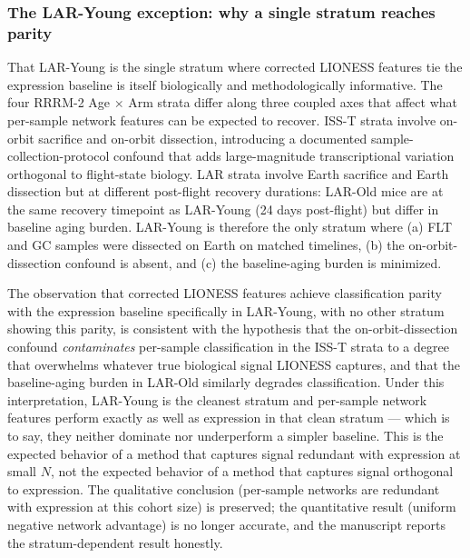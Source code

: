 \documentclass[11pt]{article}
\begin{document}
\subsubsection*{The LAR-Young exception: why a single stratum reaches parity}

That LAR-Young is the single stratum where corrected LIONESS features tie the expression baseline is itself biologically and methodologically informative. The four RRRM-2 Age $\times$ Arm strata differ along three coupled axes that affect what per-sample network features can be expected to recover. ISS-T strata involve on-orbit sacrifice and on-orbit dissection, introducing a documented sample-collection-protocol confound \citep{galazka2020rnaseq} that adds large-magnitude transcriptional variation orthogonal to flight-state biology. LAR strata involve Earth sacrifice and Earth dissection but at different post-flight recovery durations: LAR-Old mice are at the same recovery timepoint as LAR-Young (24 days post-flight) but differ in baseline aging burden. LAR-Young is therefore the only stratum where (a) FLT and GC samples were dissected on Earth on matched timelines, (b) the on-orbit-dissection confound is absent, and (c) the baseline-aging burden is minimized.

The observation that corrected LIONESS features achieve classification parity with the expression baseline specifically in LAR-Young, with no other stratum showing this parity, is consistent with the hypothesis that the on-orbit-dissection confound \emph{contaminates} per-sample classification in the ISS-T strata to a degree that overwhelms whatever true biological signal LIONESS captures, and that the baseline-aging burden in LAR-Old similarly degrades classification. Under this interpretation, LAR-Young is the cleanest stratum and per-sample network features perform exactly as well as expression in that clean stratum --- which is to say, they neither dominate nor underperform a simpler baseline. This is the expected behavior of a method that captures signal redundant with expression at small $N$, not the expected behavior of a method that captures signal orthogonal to expression. The qualitative conclusion (per-sample networks are redundant with expression at this cohort size) is preserved; the quantitative result (uniform negative network advantage) is no longer accurate, and the manuscript reports the stratum-dependent result honestly.
\end{document}
